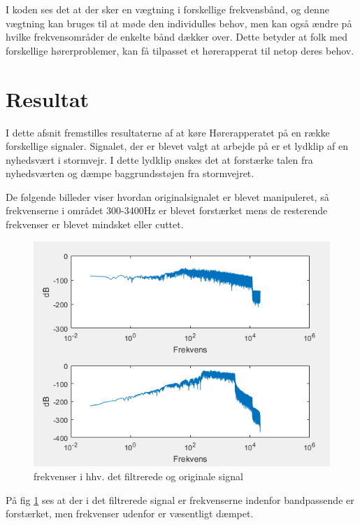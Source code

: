 I koden ses det at der sker en vægtning i forskellige frekvensbånd, og denne vægtning kan bruges til at møde den individulles behov, men kan også ændre på hvilke frekvensområder de enkelte bånd dækker over. Dette betyder at folk med forskellige hørerproblemer, kan få tilpasset et hørerapperat til netop deres behov.


\section{Resultat}
I dette afsnit fremstilles resultaterne af at køre Hørerapperatet på en række forskellige signaler. Signalet, der er blevet valgt at arbejde på er et lydklip af en nyhedsvært i stormvejr. I dette lydklip ønskes det at forstærke talen fra nyhedsværten og dæmpe baggrundsstøjen fra stormvejret.


De følgende billeder viser hvordan originalsignalet er blevet manipuleret, så frekvenserne i området 300-3400Hz er blevet forstærket mens de resterende frekvenser er blevet mindsket eller cuttet.   


\begin{figure}[H]
	\centering
	\includegraphics[width=150mm]{figures/hoereapparat_resultat.PNG}
	\caption{frekvenser i hhv. det filtrerede og originale signal}
	\label{fig:Samlet frekvensplot}
\end{figure}


På fig \ref{fig:Samlet frekvensplot} ses at der i det filtrerede signal er frekvenserne indenfor bandpassende er forstærket, men frekvenser udenfor er væsentligt dæmpet.


